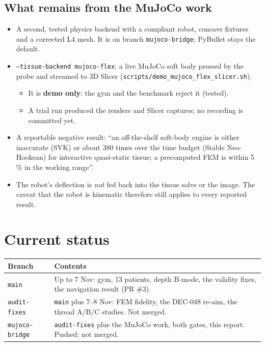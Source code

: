 \documentclass[11pt,a4paper]{article}
\newcommand{\src}[1]{\texttt{\small #1}}
\newcommand{\dec}[1]{\textsf{#1}}
\begin{document}
\subsection{What remains from the MuJoCo work}
\begin{itemize}
  \item A second, tested physics backend with a compliant robot, concave fixtures and a corrected L4 mesh. It is on
    branch \src{mujoco-bridge}; PyBullet stays the default.
  \item \texttt{--tissue-backend mujoco-flex}: a live MuJoCo soft body pressed by the probe and streamed to 3D
    Slicer (\src{scripts/demo\_mujoco\_flex\_slicer.sh}).
    \begin{itemize}
      \item It is \textbf{demo only}: the gym and the benchmark reject it (tested).
      \item A trial run produced the renders and Slicer captures; no recording is committed yet.
    \end{itemize}
  \item A reportable negative result: ``an off-the-shelf soft-body engine is either inaccurate (SVK) or about
    380 times over the time budget (Stable Neo-Hookean) for interactive quasi-static tissue; a precomputed FEM is within
    5\,\% in the working range''.
  \item The robot's deflection is \emph{not} fed back into the tissue solve or the image. The caveat that the
    robot is kinematic therefore still applies to every reported result.
\end{itemize}

\section{Current status}

\begin{table}[h]
\centering\small
\begin{tabularx}{\linewidth}{@{}lX@{}}
\toprule
Branch & Contents \\
\midrule
\src{main} & Up to 7 Nov: gym, 13 patients, depth B-mode, the validity fixes, the navigation result (PR \#3). \\
\src{audit-fixes} & \src{main} plus 7--8 Nov: FEM fidelity, the \dec{DEC-048} re-aim, the thread A/B/C studies. Not merged. \\
\src{mujoco-bridge} & \src{audit-fixes} plus the MuJoCo work, both gates, this report. Pushed; not merged. \\
\bottomrule
\end{tabularx}
\end{table}
\end{document}
